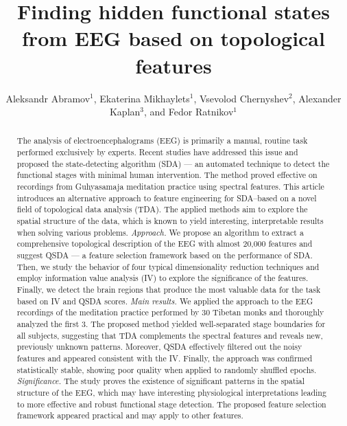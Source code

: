 \documentclass[10pt]{iopart}
\begin{document}
\title[Finding hidden functional states from EEG based on topological features]
        {Finding hidden functional states from EEG based on topological features}

\author{Aleksandr Abramov$^1$, Ekaterina Mikhaylets$^1$, Vsevolod Chernyshev$^2$, Alexander Kaplan$^3$, and Fedor Ratnikov$^1$}

\address{$^1$ Faculty of Computer Science, HSE University, Moscow, Russia}
\address{$^2$ Ulm University, Ulm, Germany}
\address{$^3$ Lomonosov Moscow State University, Moscow, Russia}


\begin{abstract}

The analysis of electroencephalograms (EEG) is primarily a manual, routine task performed exclusively by experts. Recent studies have addressed this issue and proposed the state-detecting algorithm (SDA) --- an automated technique to detect the functional stages with minimal human intervention. The method proved effective on recordings from Guhyasamaja meditation practice using spectral features. This article introduces an alternative approach to feature engineering for SDA--based on a novel field of topological data analysis (TDA). The applied methods aim to explore the spatial structure of the data, which is known to yield interesting, interpretable results when solving various problems.
\textit{Approach.}
We propose an algorithm to extract a comprehensive topological description of the EEG with almost 20,000 features and suggest QSDA --- a feature selection framework based on the performance of SDA\@. Then, we study the behavior of four typical dimensionality reduction techniques and employ information value analysis (IV) to explore the significance of the features. Finally, we detect the brain regions that produce the most valuable data for the task based on IV and QSDA scores.
\textit{Main results.}
We applied the approach to the EEG recordings of the meditation practice performed by 30 Tibetan monks and thoroughly analyzed the first 3. The proposed method yielded well-separated stage boundaries for all subjects, suggesting that TDA complements the spectral features and reveals new, previously unknown patterns. Moreover, QSDA effectively filtered out the noisy features and appeared consistent with the IV\@. Finally, the approach was confirmed statistically stable, showing poor quality when applied to randomly shuffled epochs.
\textit{Significance.}
The study proves the existence of significant patterns in the spatial structure of the EEG, which may have interesting physiological interpretations leading to more effective and robust functional stage detection. The proposed feature selection framework appeared practical and may apply to other features.

\end{abstract}
\end{document}
